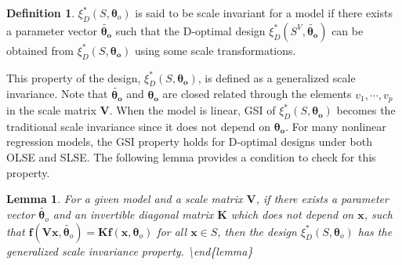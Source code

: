 \documentclass[
]{book}
\newtheorem{lemma}{Lemma}[chapter]
\theoremstyle{definition}
\newtheorem{definition}{Definition}[chapter]
\theoremstyle{definition}
\theoremstyle{definition}
\theoremstyle{definition}
\theoremstyle{remark}
\begin{document}
\begin{definition}
\protect\hypertarget{def:GSI}{}\label{def:GSI}\(\xi_D^*(S,\boldsymbol{\theta}_o)\) is said to be scale invariant for a model if there exists a parameter vector \(\tilde{\boldsymbol{\theta_o}}\) such that the D-optimal design \(\xi_D^*(S^V,\tilde{\boldsymbol{\theta_o}})\) can be obtained from \(\xi_D^*(S,\boldsymbol{\theta_o})\) using some scale transformations.
\end{definition}

This property of the design, \(\xi_D^*(S,\boldsymbol{\theta_o})\), is defined as a generalized scale invariance. Note that \(\tilde{\boldsymbol{\theta_o}}\) and \(\boldsymbol{\theta_o}\) are closed related through the elements \(v_1,\cdots,v_p\) in the scale matrix \(\boldsymbol{V}\). When the model is linear, GSI of \(\xi_D^*(S,\boldsymbol{\theta_o})\) becomes the traditional scale invariance since it does not depend on \(\boldsymbol{\theta_o}\). For many nonlinear regression models, the GSI property holds for D-optimal designs under both OLSE and SLSE. The following lemma provides a condition to check for this property.

\begin{lemma}
\protect\hypertarget{lem:GSI}{}\label{lem:GSI}For a given model and a scale matrix \(\boldsymbol{V}\), if there exists a parameter vector \(\tilde{\boldsymbol{\theta}_o}\) and an invertible diagonal matrix \(\boldsymbol{K}\) which does not depend on \(\boldsymbol{x}\), such that \(\boldsymbol{f}(\boldsymbol{V}\boldsymbol{x},\tilde{\boldsymbol{\theta}_o})=\boldsymbol{K}\boldsymbol{f}(\boldsymbol{x},\boldsymbol{\theta}_o)\) for all \(\boldsymbol{x}\in S\), then the design \(\xi_D^*(S,\boldsymbol{\theta}_o)\) has the generalized scale invariance property.
\textbackslash end\{lemma\}
\end{lemma}
\end{document}
